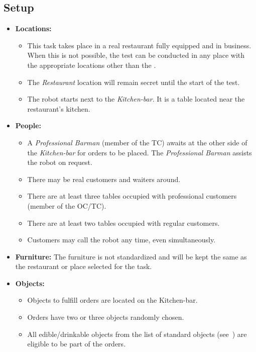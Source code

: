 \subsection*{Setup}
\begin{itemize}[nosep]	
	\item \textbf{Locations:} 
	\begin{itemize}
		\item This task takes place in a real restaurant fully equipped and in business. When this is not possible, the test can be conducted in any place with the appropriate locations other than the \Arena{}.
		\item The \emph{Restaurant} location will remain secret until the start of the test.
		\item The robot starts next to the \emph{Kitchen-bar}. It is a table located near the restaurant's kitchen.
	\end{itemize}	 
	\item \textbf{People:} 
	\begin{itemize}
		\item  A \emph{Professional Barman} (member of the TC) awaits at the other side of the \emph{Kitchen-bar} for orders to be placed. The \emph{Professional Barman} assists the robot on request.
		\item There may be real customers and waiters around.
		\item There are at least three tables occupied with professional customers (member of the OC/TC). 
		\item There are at least two tables occupied with regular customers.
		\item Customers may call the robot any time, even simultaneously.
	\end{itemize}
	\item \textbf{Furniture:} The furniture is not standardized and will be kept the same as the restaurant or place selected for the task.
	\item \textbf{Objects:} 
	\begin{itemize}
	\item Objects to fulfill orders are located on the Kitchen-bar.
	\item Orders have two or three objects randomly chosen.
	\item All edible/drinkable objects from the list of standard objects (see~) are eligible to be part of the orders.
	\end{itemize}
\end{itemize}

